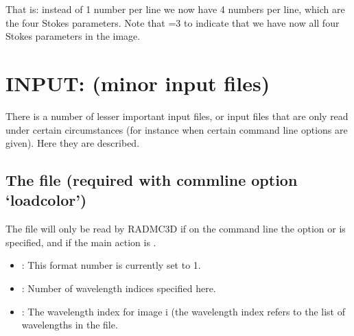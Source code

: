 \documentclass[letterpaper,10pt,english]{sphinxmanual}
\begin{document}
That is: instead of 1 number per line we now have 4 numbers per line, which
are the four Stokes parameters. Note that =3 to indicate
that we have now all four Stokes parameters in the image.


\section{INPUT: (minor input files)}
\label{\detokenize{inputoutputfiles:input-minor-input-files}}\label{\detokenize{inputoutputfiles:sec-minor-input-files}}
There is a number of lesser important input files, or input files that are
only read under certain circumstances (for instance when certain command
line options are given). Here they are described.


\subsection{The  file (required with comm\sphinxhyphen{}line option ‘loadcolor’)}
\label{\detokenize{inputoutputfiles:the-color-inus-inp-file-required-with-comm-line-option-loadcolor}}\label{\detokenize{inputoutputfiles:sec-color-inus}}
The file  will only be read by RADMC\sphinxhyphen{}3D if on the command line
the option  or  is specified, and if the main action is
.

\begin{sphinxVerbatim}[commandchars=\\\{\}]
                           
\PYG{p}{[}\PYG{p}{]}
\PYG{p}{[}\PYG{p}{]}
\end{sphinxVerbatim}
\begin{itemize}
\item {} 
: This format number is currently set to 1.

\item {} 
: Number of wavelength indices specified here.

\item {} 
: The wavelength index for image i (the wavelength
index refers to the list of wavelengths in the  file.

\end{itemize}
\end{document}
